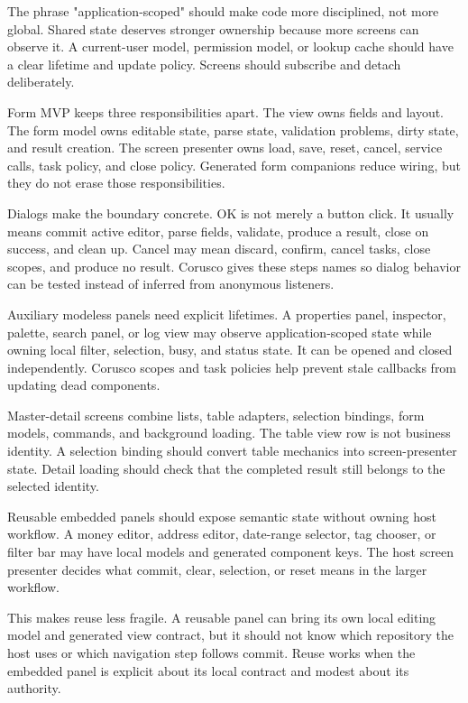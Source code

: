 The phrase "application-scoped" should make code more disciplined, not more global. Shared state deserves stronger ownership because more screens can observe it. A current-user model, permission model, or lookup cache should have a clear lifetime and update policy. Screens should subscribe and detach deliberately.

Form MVP keeps three responsibilities apart. The view owns fields and layout. The form model owns editable state, parse state, validation problems, dirty state, and result creation. The screen presenter owns load, save, reset, cancel, service calls, task policy, and close policy. Generated form companions reduce wiring, but they do not erase those responsibilities.

Dialogs make the boundary concrete. OK is not merely a button click. It usually means commit active editor, parse fields, validate, produce a result, close on success, and clean up. Cancel may mean discard, confirm, cancel tasks, close scopes, and produce no result. Corusco gives these steps names so dialog behavior can be tested instead of inferred from anonymous listeners.

Auxiliary modeless panels need explicit lifetimes. A properties panel, inspector, palette, search panel, or log view may observe application-scoped state while owning local filter, selection, busy, and status state. It can be opened and closed independently. Corusco scopes and task policies help prevent stale callbacks from updating dead components.

Master-detail screens combine lists, table adapters, selection bindings, form models, commands, and background loading. The table view row is not business identity. A selection binding should convert table mechanics into screen-presenter state. Detail loading should check that the completed result still belongs to the selected identity.

Reusable embedded panels should expose semantic state without owning host workflow. A money editor, address editor, date-range selector, tag chooser, or filter bar may have local models and generated component keys. The host screen presenter decides what commit, clear, selection, or reset means in the larger workflow.

This makes reuse less fragile. A reusable panel can bring its own local editing model and generated view contract, but it should not know which repository the host uses or which navigation step follows commit. Reuse works when the embedded panel is explicit about its local contract and modest about its authority.

